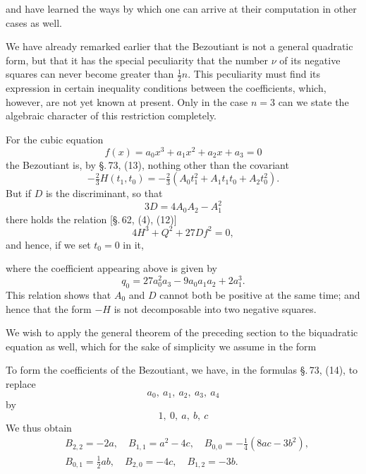 
and have learned the ways by which one can arrive at their computation in other cases as well.

We have already remarked earlier that the Bezoutiant is not a general quadratic form, but that it has the special peculiarity that the number $\nu$ of its negative squares can never become greater than $\frac{1}{2}n$. This peculiarity must find its expression in certain inequality conditions between the coefficients, which, however, are not yet known at present. Only in the case $n = 3$ can we state the algebraic character of this restriction completely.

For the cubic equation
\[
f(x) = a_0 x^3 + a_1 x^2 + a_2 x + a_3 = 0
\]
the Bezoutiant is, by \S.\,73, (13), nothing other than the  covariant
\[
-\tfrac{2}{3} H(t_1, t_0) = -\tfrac{2}{3}(A_0 t_1^2 + A_1 t_1 t_0 + A_2 t_0^2).
\]
But if $D$ is the discriminant, so that
\[
3D = 4A_0 A_2 - A_1^2
\]
there holds the relation [\S.\,62, (4), (12)]
\[
4H^3 + Q^2 + 27Df^2 = 0,
\]
and hence, if we set $t_0 = 0$ in it,


where the coefficient appearing above is given by
\[
q_0 = 27a_0^2 a_3 - 9a_0 a_1 a_2 + 2a_1^3\text{.}
\]
This relation shows that $A_0$ and $D$ cannot both be positive at the same time; and hence that the form $-H$ is not decomposable into two negative squares.

We wish to apply the general theorem of the preceding section to the biquadratic equation as well, which for the sake of simplicity we assume in the form


To form the coefficients of the Bezoutiant, we have, in the formulas \S.\,73, (14), to replace
\[
a_0,\ a_1,\ a_2,\ a_3,\ a_4
\]
by
\[
1,\ 0,\ a,\ b,\ c
\]
We thus obtain
\[
\begin{aligned}
&B_{2,2} = -2a, \quad B_{1,1} = a^2 - 4c, \quad B_{0,0} = -\tfrac{1}{4}(8ac - 3b^2), \\
&B_{0,1} = \tfrac{1}{2}ab, \quad B_{2,0} = -4c, \quad B_{1,2} = -3b.
\end{aligned}
\]
